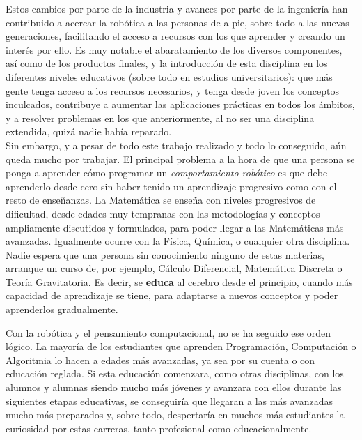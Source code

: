Estos cambios por parte de la industria y avances por parte de la ingeniería han contribuido a acercar la robótica a las personas de a pie, sobre todo a las nuevas generaciones, facilitando el acceso a recursos con los que aprender y creando un interés por ello. Es muy notable el abaratamiento de los diversos componentes, así como de los productos finales, y la introducción de esta disciplina en los diferentes niveles educativos (sobre todo en estudios universitarios): que más gente tenga acceso a los recursos necesarios, y tenga desde joven los conceptos inculcados, contribuye a aumentar las aplicaciones prácticas en todos los ámbitos, y a resolver problemas en los que anteriormente, al no ser una disciplina extendida, quizá nadie había reparado. \\

Sin embargo, y a pesar de todo este trabajo realizado y todo lo conseguido, aún queda mucho por trabajar. El principal problema a la hora de que una persona se ponga a aprender cómo programar un \textit{comportamiento robótico} es que debe aprenderlo desde cero sin haber tenido un aprendizaje progresivo como con el resto de enseñanzas. La Matemática se enseña con niveles progresivos de dificultad, desde edades muy tempranas con las metodologías y conceptos ampliamente discutidos y formulados, para poder llegar a las Matemáticas más avanzadas. Igualmente ocurre con la Física, Química, o cualquier otra disciplina. Nadie espera que una persona sin conocimiento ninguno de estas materias, arranque  un curso de, por ejemplo, Cálculo Diferencial, Matemática Discreta o Teoría Gravitatoria. Es decir, se \textbf{educa} al cerebro desde el principio, cuando más capacidad de aprendizaje se tiene, para adaptarse a nuevos conceptos y poder aprenderlos gradualmente. \\
\par Con la robótica y el pensamiento computacional, no se ha seguido ese orden lógico. La mayoría de los estudiantes que aprenden Programación, Computación o Algoritmia lo hacen a edades más avanzadas, ya sea por su cuenta o con educación reglada. Si esta educación comenzara, como otras disciplinas, con los alumnos y alumnas siendo mucho más jóvenes y avanzara con ellos durante las siguientes etapas educativas, se conseguiría que llegaran a las más avanzadas mucho más preparados y, sobre todo, despertaría en muchos más estudiantes la curiosidad por estas carreras, tanto profesional como educacionalmente.

